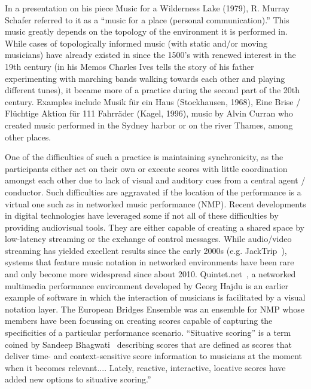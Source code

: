 In a presentation on his piece Music for a Wilderness Lake (1979), R. Murray Schafer referred to it as a ``music for a place (personal communication).'' 
This music greatly depends on the topology of the environment it is performed in. While cases of topologically informed music (with static and/or moving musicians) have already existed in since the 1500’s with renewed interest in the 19th century (in his Memos Charles Ives tells the story of his father experimenting with marching bands walking towards each other and playing different tunes), it became more of a practice during the second part of the 20th century. Examples include Musik f\"ur ein Haus (Stockhausen, 1968), Eine Brise / Fl\"uchtige Aktion f\"ur 111 Fahrr\"ader (Kagel, 1996), music by Alvin Curran who created music performed in the Sydney harbor or on the river Thames, among other places.

One of the difficulties of such a practice is maintaining synchronicity, as the participants either act on their own or execute scores with little coordination amongst each other due to lack of visual and auditory cues from a central agent / conductor. Such difficulties are aggravated if the location of the performance is a virtual one such as in networked music performance (NMP). Recent developments in digital technologies have leveraged some if not all of these difficulties by providing audiovisual tools. They are either capable of creating a shared space by low-latency streaming or the exchange of control messages. While audio/video streaming has yielded excellent results since the early 2000s  (e.g. JackTrip~\cite{caceres2010jacktrip}), systems that feature music notation in networked environments have been rare and only become more widespread since about 2010. Quintet.net~\cite{hajdu2005quintet}, a networked multimedia performance environment developed by Georg Hajdu is an earlier example of software in which the interaction of musicians is facilitated by a visual notation layer. The European Bridges Ensemble was an ensemble for NMP whose members have been  focussing on creating scores capable of capturing the specificities of a particular performance scenario. ``Situative scoring'' is a term coined by Sandeep Bhagwati~\cite{bhagwati2017vexations} describing scores that are defined as scores that deliver time- and context-sensitive score information to musicians at the moment when it becomes relevant.... Lately, reactive, interactive, locative scores have added new options to situative scoring.''

